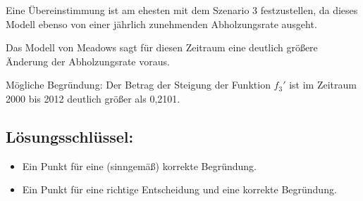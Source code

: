 \begin{langesbeispiel}
{\begin{enumerate}
	Eine Übereinstimmung ist am ehesten mit dem Szenario 3 festzustellen, da dieses Modell ebenso von einer jährlich zunehmenden Abholzungsrate ausgeht.
	
Das Modell von Meadows sagt für diesen Zeitraum eine deutlich größere Änderung der Abholzungsrate voraus.

Mögliche Begründung: Der Betrag der Steigung der Funktion $f_3'$ ist im Zeitraum 2000 bis 2012 deutlich größer als 0,2101.

	\subsection{Lösungsschlüssel:}
	
\begin{itemize}
	\item Ein Punkt für eine (sinngemäß) korrekte Begründung. 
	\item Ein Punkt für eine richtige Entscheidung und eine korrekte Begründung.
\end{itemize}

\end{enumerate}}
		\end{langesbeispiel}